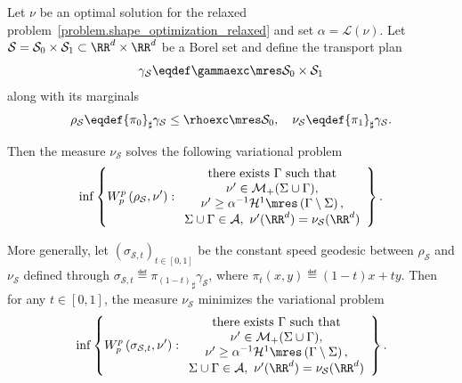 \begin{lemma}\label{lemma.auxiliary_problem}
Let $\nu$ be an optimal solution for the relaxed problem~\eqref{problem.shape_optimization_relaxed} and set $\alpha = \mathcal{L}(\nu)$. Let $\mathcal{S} = \mathcal{S}_0\times \mathcal{S}_1 \subset \RR^d\times \RR^d$ be a Borel set and define the transport plan
\[
\gamma_{\mathcal{S}} \eqdef \gammaexc \mres \mathcal{S}_0\times \mathcal{S}_1
\]
along with its marginals
\[
\rho_{\mathcal{S}} \eqdef {\pi_{0}}_\sharp\gamma_\mathcal{S}
\le \rhoexc \mres \mathcal{S}_0,
\quad \nu_{\mathcal{S}} \eqdef {\pi_{1}}_\sharp\gamma_{\mathcal{S}}.
\]

Then the measure $\nu_{\mathcal{S}}$ solves the following variational problem
\begin{equation}
\inf
\left\{
W_p^p\left(
\rho_{\mathcal{S}}, \nu'
\right) :
\begin{array}{c}
\text{there exists $\Gamma$ such that}\\
\nu' \in \mathcal{M}_+(\Sigma \cup \Gamma),\\
\nu' \ge \alpha^{-1}\mathcal{H}^1\mres \left(\Gamma\setminus \Sigma\right), \\
\Sigma \cup \Gamma \in \mathcal{A}, \
\nu'(\RR^d) = \nu_{\mathcal{S}}(\RR^d)
\end{array}
\right\}.
\end{equation}

More generally, let $\left(\sigma_{\mathcal{S},t}\right)_{t \in [0,1]}$ be the constant speed geodesic between $\rho_{\mathcal{S}}$ and $\nu_{\mathcal{S}}$ defined through $\sigma_{\mathcal{S},t} \eqdef {\pi_{(1-t)}}_\sharp\gamma_{\mathcal{S}}$, where $\pi_t(x,y) \eqdef (1-t)x + ty$. Then for any $t \in [0,1]$, the measure $\nu_{\mathcal{S}}$ minimizes the variational problem
\begin{equation}\label{auxiliary_problem_sigma}
\inf
\left\{
W_p^p\left(
\sigma_{\mathcal{S}, t}, \nu'
\right) :
\begin{array}{c}
\text{there exists $\Gamma$ such that}\\
\nu' \in \mathcal{M}_+(\Sigma \cup \Gamma),\\
\nu' \ge \alpha^{-1}\mathcal{H}^1\mres \left(\Gamma\setminus \Sigma\right), \\
\Sigma \cup \Gamma \in \mathcal{A}, \
\nu'(\RR^d) = \nu_{\mathcal{S}}(\RR^d)
\end{array}
\right\}.
\end{equation}
\end{lemma}

